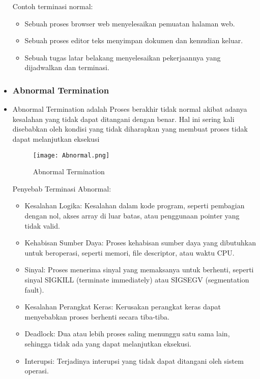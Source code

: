 \documentclass[12pt]{article}
\begin{document}
\begin{itemize}
        Contoh terminasi normal:
        \begin{itemize}
            \item Sebuah proses browser web menyelesaikan pemuatan halaman web.
            \item Sebuah proses editor teks menyimpan dokumen dan kemudian keluar.
            \item Sebuah tugas latar belakang menyelesaikan pekerjaannya yang dijadwalkan dan terminasi.
        \end{itemize} 
    
    
    \item 
    \subsubsection {Abnormal Termination}
    
    \item Abnormal Termination adalah Proses berakhir tidak normal akibat adanya kesalahan yang tidak dapat ditangani dengan benar. Hal ini sering kali disebabkan oleh kondisi yang tidak diharapkan yang membuat proses tidak dapat melanjutkan eksekusi
    
        \begin{figure}
            \centering
            \texttt{[image: Abnormal.png]}
            \caption{Abnormal Termination}
            \label{Abnormal}
        \end{figure}
    
    
    Penyebab Terminasi Abnormal:
    \begin{itemize}
        \item Kesalahan Logika: Kesalahan dalam kode program, seperti pembagian dengan nol, akses array di luar batas, atau penggunaan pointer yang tidak valid.
        \item Kehabisan Sumber Daya: Proses kehabisan sumber daya yang dibutuhkan untuk beroperasi, seperti memori, file descriptor, atau waktu CPU.
        \item Sinyal: Proses menerima sinyal yang memaksanya untuk berhenti, seperti sinyal SIGKILL (terminate immediately) atau SIGSEGV (segmentation fault).
        \item Kesalahan Perangkat Keras: Kerusakan perangkat keras dapat menyebabkan proses berhenti secara tiba-tiba.
        \item Deadlock: Dua atau lebih proses saling menunggu satu sama lain, sehingga tidak ada yang dapat melanjutkan eksekusi.
        \item Interupsi: Terjadinya interupsi yang tidak dapat ditangani oleh sistem operasi.
    \end{itemize}
    

\end{itemize}
\end{document}
